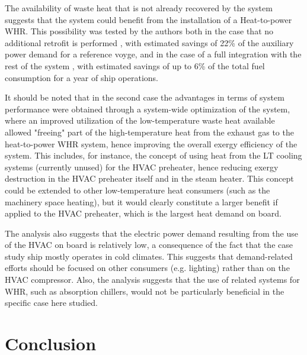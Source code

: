 \documentclass[preprint,12pt]{elsarticle}
\begin{document}
The availability of waste heat that is not already recovered by the system suggests that the system could benefit from the installation of a Heat-to-power WHR. This possibility was tested by the authors both in the case that no additional retrofit is performed \cite{Ahlgren2016,Mondejar2017}, with estimated savings of 22\% of the auxiliary power demand for a reference voyge, and in the case of a full integration with the rest of the system \cite{Baldi2017}, with estimated savings of up to 6\% of the total fuel consumption for a year of ship operations. 

It should be noted that in the second case the advantages in terms of system performance were obtained through a system-wide optimization of the system, where an improved utilization of the low-temperature waste heat available allowed "freeing" part of the high-temperature heat from the exhaust gas to the heat-to-power WHR system, hence improving the overall exergy efficiency of the system. This includes, for instance, the concept of using heat from the LT cooling systems (currently unused) for the HVAC preheater, hence reducing exergy destruction in the HVAC preheater itself and in the steam heater. This concept could be extended to other low-temperature heat consumers (such as the machinery space heating), but it would clearly constitute a larger benefit if applied to the HVAC preheater, which is the largest heat demand on board. 

The analysis also suggests that the electric power demand resulting from the use of the HVAC on board is relatively low, a consequence of the fact that the case study ship mostly operates in cold climates. This suggests that demand-related efforts should be focused on other consumers (e.g. lighting) rather than on the HVAC compressor. Also, the analysis suggests that the use of related systems for WHR, such as absorption chillers, would not be particularly beneficial in the specific case here studied. 



\section{Conclusion}
\label{sec:conclusion}
\end{document}
